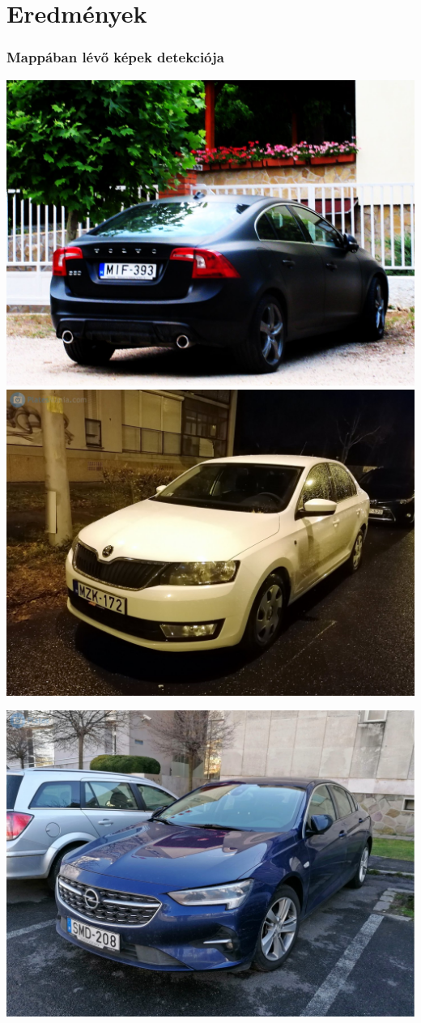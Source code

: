 \documentclass[aspectratio=169]{beamer}
\begin{document}
\section{Eredmények}
\begin{frame}[fragile]
	\frametitle{Mappában lévő képek detekciója}
	\begin{minipage}{.33\textwidth}
		\centering
		\includegraphics[height=.6\textwidth]{images/test-img-1.jpg}\\
		\includegraphics[height=.6\textwidth]{images/test-img-2.jpg}
	\end{minipage}\begin{minipage}{.33\textwidth}
		\centering
		\includegraphics[height=.6\textwidth]{images/test-img-3.jpg}\\

\end{minipage}
\end{frame}
\end{document}

